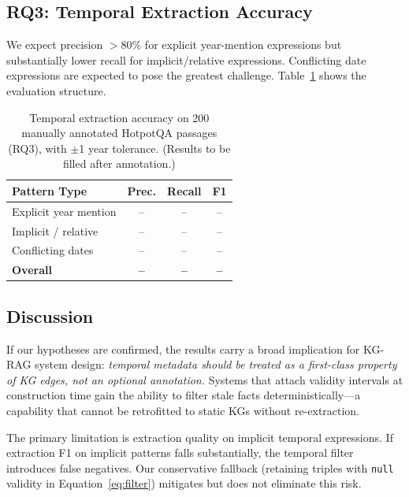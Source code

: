 \documentclass[11pt]{article}
\begin{document}
\subsection{RQ3: Temporal Extraction Accuracy}

We expect precision $>$80\% for explicit year-mention expressions but
substantially lower recall for implicit/relative expressions. Conflicting
date expressions are expected to pose the greatest challenge.
Table~\ref{tab:extraction} shows the evaluation structure.

\begin{table}[t]
  \centering
  \small
  \begin{tabular}{lccc}
    \toprule
    \textbf{Pattern Type} & \textbf{Prec.} & \textbf{Recall} & \textbf{F1} \\
    \midrule
    Explicit year mention & -- & -- & -- \\
    Implicit / relative   & -- & -- & -- \\
    Conflicting dates     & -- & -- & -- \\
    \midrule
    \textbf{Overall}      & \textbf{--} & \textbf{--} & \textbf{--} \\
    \bottomrule
  \end{tabular}
  \caption{Temporal extraction accuracy on 200 manually annotated
  HotpotQA passages (RQ3), with $\pm$1 year tolerance.
  (Results to be filled after annotation.)}
  \label{tab:extraction}
\end{table}

\subsection{Discussion}

If our hypotheses are confirmed, the results carry a broad implication
for KG-RAG system design: \textit{temporal metadata should be treated as a
first-class property of KG edges, not an optional annotation.} Systems that
attach validity intervals at construction time gain the ability to filter
stale facts deterministically---a capability that cannot be retrofitted to
static KGs without re-extraction.

The primary limitation is extraction quality on implicit temporal
expressions. If extraction F1 on implicit patterns falls substantially,
the temporal filter introduces false negatives. Our conservative fallback
(retaining triples with \texttt{null} validity in Equation~\ref{eq:filter})
mitigates but does not eliminate this risk.
\end{document}
